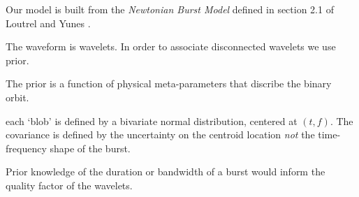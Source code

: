 
Our model is built from the \textit{Newtonian Burst Model} defined in section 2.1 of Loutrel and Yunes \cite{ly2017}.

The waveform is wavelets.
In order to associate disconnected wavelets we use prior.

The prior is a function of physical meta-parameters that discribe the binary orbit.

each `blob' is defined by a bivariate normal distribution, centered at $(t,f)$.
The covariance is defined by the uncertainty on the centroid location \textit{not} the time-frequency shape of the burst.

Prior knowledge of the duration or bandwidth of a burst would inform the quality factor of the wavelets.
